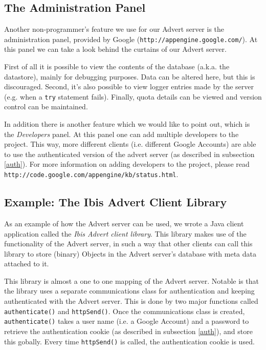 \subsection{The Administration Panel}
\label{admin-panel}
Another non-programmer's feature we use for our Advert server is the
administration panel, provided by Google (\texttt{http://appengine.google.com/}).
At this panel we can take a look behind the curtains of our Advert server.

First of all it is possible to view the contents of the database (a.k.a. the
datastore), mainly for debugging purposes. Data can be altered here, but this
is discouraged. Second, it's also possible to view logger entries made by the
server (e.g. when a \texttt{try} statement fails). Finally, quota details can
be viewed and version control can be maintained.

In addition there is another feature which we would like to point out, which is
the \emph{Developers} panel. At this panel one can add multiple developers to
the project. This way, more different clients (i.e. different Google Accounts)
are able to use the authenticated version of the advert server (as described in
subsection \ref{auth}). For more information on adding developers to the project,
please read \texttt{http://code.google.com/appengine/kb/status.html}.

\subsection{Example: The Ibis Advert Client Library}
\label{advert-lib}
As an example of how the Advert server can be used, we wrote a Java client
application called the \emph{Ibis Advert client library}. This library makes use
of the functionality of the Advert server, in such a way that other clients can
call this library to store (binary) Objects in the Advert server's database
with meta data attached to it.

This library is almost a one to one mapping of the Advert server. Notable is
that the library uses a separate communications class for authentication and
keeping authenticated with the Advert server. This is done by two major
functions called \texttt{authenticate()} and \texttt{httpSend()}. Once the
communications class is created,  \texttt{authenticate()} takes a user name
(i.e. a Google Account) and a password to retrieve the authentication cookie
(as described in subsection \ref{auth}), and store this gobally. Every time
\texttt{httpSend()} is called, the authentication cookie is used.

